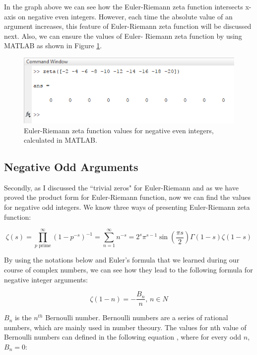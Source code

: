 \documentclass[a4paper]{article}
\begin{document}
In the graph above we can see how the Euler-Riemann zeta function intersects
x-axis on negative even integers. However, each time the absolute value of an
argument increases, this feature of Euler-Riemann zeta function will be
discussed next. Also, we can ensure the values of Euler- Riemann zeta function
by using MATLAB as shown in Figure \ref{fig:org1dc130c}. 

\begin{figure}[htbp]
\centering
\includegraphics[width=.9\linewidth]{./zerosv.png}
\caption{\label{fig:org1dc130c}
Euler-Riemann zeta function values for negative even integers, calculated in MATLAB.}
\end{figure}

\subsection{Negative Odd Arguments}
\label{sec:orga6e9ac2}

Secondly, as I discussed the “trivial zeros" for Euler-Riemann and as we have
proved the product form for Euler-Riemann function, now we can find the values
for negative odd integers. We know three ways of presenting Euler-Riemann zeta
function: 

\begin{equation}
  \zeta(s)=\prod_{p \text{ prime}}^{\infty} {(1-p^{-s})}^{-1}=\sum_{n=1}^{\infty} 
n^{-s}=2^s\pi^{s-1}\sin(\frac{\pi s}{2})\Gamma(1-s)\zeta(1-s)
  \end{equation}

By using the notations below and Euler's formula that we learned during our
course of complex numbers, we can see how they lead \cite{Bern} to the following
formula for negative integer arguments: 

\begin{equation}
  \label{bnn}
  \zeta(1-n)=-\frac{B_n}{n} \text{, $n\in N$}
  \end{equation}

\(B_n\) is the \(n^{th}\) Bernoulli number. Bernoulli numbers are a series of
rational numbers, which are mainly used in number theoury. The values for nth
value of Bernoulli numbers can defined in the following equation \cite{BernSeq},
where for every odd \(n\), \(B_n=0\):
\end{document}
